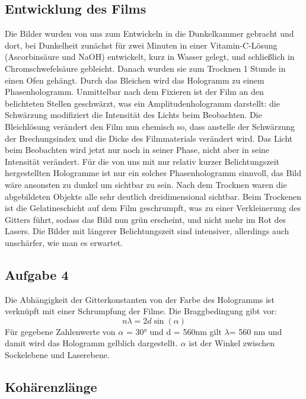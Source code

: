 \documentclass[10pt,a4paper]{article}
\begin{document}
\subsection{Entwicklung des Films}



Die Bilder wurden von uns zum Entwickeln in die Dunkelkammer gebracht und dort, bei Dunkelheit zunächst für zwei Minuten in einer Vitamin-C-Lösung (Ascorbinsäure und NaOH) entwickelt, kurz in Wasser gelegt, und schließlich in Chromschwefelsäure gebleicht. Danach wurden sie zum Trocknen 1 Stunde in einen Ofen gehängt. Durch das Bleichen wird das Hologramm zu einem Phasenhologramm. 
Unmittelbar nach dem Fixieren ist der Film an den belichteten Stellen geschwärzt, was ein Amplitudenhologramm darstellt: die Schwärzung modifiziert die Intensität des Lichts beim Beobachten. Die Bleichlösung verändert den Film nun 
chemisch so, dass anstelle der Schwärzung der Brechungsindex und die Dicke des Filmmaterials verändert wird. Das Licht beim Beobachten wird jetzt nur noch in seiner Phase, nicht aber in seine Intensität verändert. Für die von uns mit nur relativ kurzer Belichtungszeit hergestellten Hologramme ist nur ein solches Phasenhologramm sinnvoll, das Bild wäre ansonsten zu dunkel um sichtbar zu sein. Nach dem Trocknen waren die abgebildeten Objekte alle sehr deutlich dreidimensional sichtbar. Beim Trockenen ist die Gelatineschicht auf dem Film geschrumpft, was zu einer Verkleinerung des Gitters führt, sodass das Bild nun grün erscheint, und nicht mehr im Rot des Lasers. Die Bilder mit längerer Belichtungszeit sind intensiver, allerdings auch unschärfer, wie man es erwartet.


\subsection{Aufgabe 4}
Die Abhängigkeit der Gitterkonstanten von der Farbe des Hologramms ist verknüpft mit einer Schrumpfung der Filme.
Die Braggbedingung gibt vor:
\begin{equation}
n \lambda= 2d \sin(\alpha) 
\end{equation}
Für gegebene Zahlenwerte von $\alpha $ = 30° und d = 560nm gilt $\lambda$= 560 nm und damit wird das Hologramm gelblich dargestellt. $\alpha $ ist der Winkel zwischen Sockelebene und Laserebene.


\subsection{Kohärenzlänge}
\end{document}
